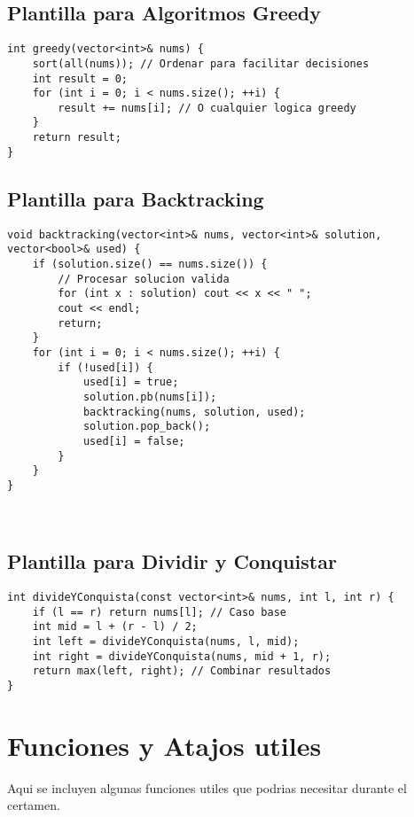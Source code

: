 \subsection{Plantilla para Algoritmos Greedy}

\begin{lstlisting}[style=cpp]
int greedy(vector<int>& nums) {
    sort(all(nums)); // Ordenar para facilitar decisiones
    int result = 0;
    for (int i = 0; i < nums.size(); ++i) {
        result += nums[i]; // O cualquier logica greedy
    }
    return result;
}
\end{lstlisting}

\subsection{Plantilla para Backtracking}

\begin{lstlisting}[style=cpp]
void backtracking(vector<int>& nums, vector<int>& solution, vector<bool>& used) {
    if (solution.size() == nums.size()) {
        // Procesar solucion valida
        for (int x : solution) cout << x << " ";
        cout << endl;
        return;
    }
    for (int i = 0; i < nums.size(); ++i) {
        if (!used[i]) {
            used[i] = true;
            solution.pb(nums[i]);
            backtracking(nums, solution, used);
            solution.pop_back();
            used[i] = false;
        }
    }
}



\end{lstlisting}

\subsection{Plantilla para Dividir y Conquistar}

\begin{lstlisting}[style=cpp]
int divideYConquista(const vector<int>& nums, int l, int r) {
    if (l == r) return nums[l]; // Caso base
    int mid = l + (r - l) / 2;
    int left = divideYConquista(nums, l, mid);
    int right = divideYConquista(nums, mid + 1, r);
    return max(left, right); // Combinar resultados
}
\end{lstlisting}

\section{Funciones y Atajos utiles}

Aqui se incluyen algunas funciones utiles que podrias necesitar durante el certamen.



